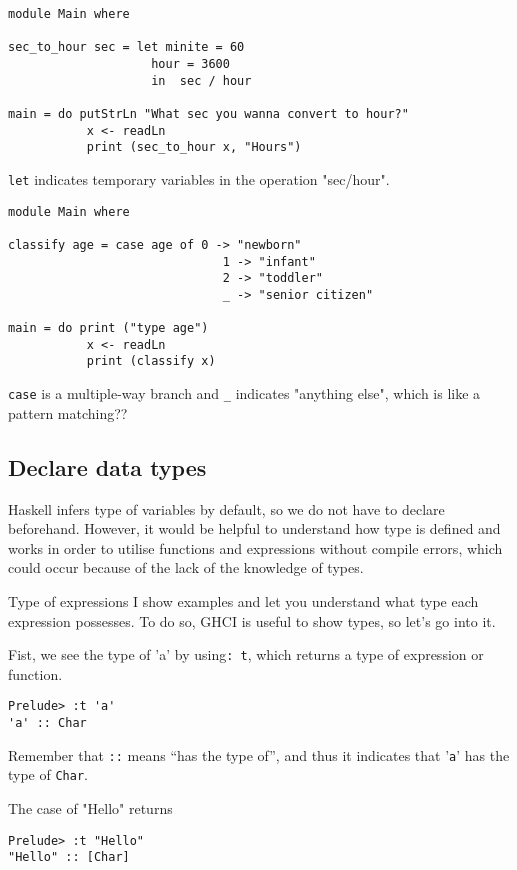 \begin{lstlisting}
module Main where

sec_to_hour sec = let minite = 60
                    hour = 3600
                    in  sec / hour

main = do putStrLn "What sec you wanna convert to hour?"
           x <- readLn
           print (sec_to_hour x, "Hours")
\end{lstlisting}

\lstinline{let} indicates temporary variables in the operation "sec/hour". 
\begin{lstlisting}
module Main where

classify age = case age of 0 -> "newborn"
                              1 -> "infant"
                              2 -> "toddler"
                              _ -> "senior citizen"

main = do print ("type age")
           x <- readLn
           print (classify x)
\end{lstlisting}

\lstinline{case} is a multiple-way branch and \lstinline{_} indicates "anything else", which is like a pattern matching??

\subsection{Declare data types}
Haskell infers type of variables by default, so we do not have to declare beforehand. 
However, it would be helpful to understand how type is defined and works in order to utilise functions and expressions without compile errors, which could occur because of the lack of the knowledge of types.

Type of expressions
I show examples and let you understand what type each expression possesses. To do so, GHCI is useful to show types, so let’s go into it.

Fist, we see the type of 'a' by using\lstinline{: t}, which returns a type of expression or function. 
\begin{lstlisting}
Prelude> :t 'a'
'a' :: Char
\end{lstlisting}

Remember that \lstinline{::} means “has the type of”, and thus it indicates that '\lstinline{a}' has the type of \lstinline{Char}.

The case of "Hello" returns
\begin{lstlisting}
Prelude> :t "Hello"
"Hello" :: [Char]
\end{lstlisting}

